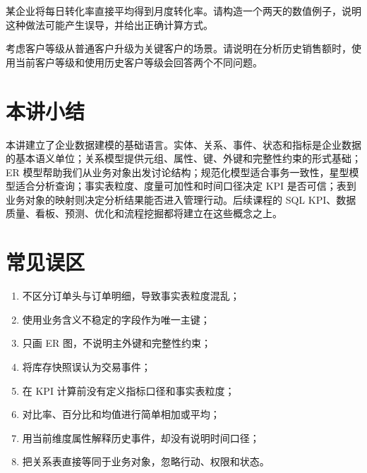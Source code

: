 \documentclass[UTF8,fontset=fandol,openany,zihao=-4]{ctexbook}
\begin{document}
\begin{exercise}
某企业将每日转化率直接平均得到月度转化率。请构造一个两天的数值例子，说明这种做法可能产生误导，并给出正确计算方式。
\end{exercise}

\begin{exercise}
考虑客户等级从普通客户升级为关键客户的场景。请说明在分析历史销售额时，使用当前客户等级和使用历史客户等级会回答两个不同问题。
\end{exercise}

\section*{本讲小结}

本讲建立了企业数据建模的基础语言。实体、关系、事件、状态和指标是企业数据的基本语义单位；关系模型提供元组、属性、键、外键和完整性约束的形式基础；ER 模型帮助我们从业务对象出发讨论结构；规范化模型适合事务一致性，星型模型适合分析查询；事实表粒度、度量可加性和时间口径决定 KPI 是否可信；表到业务对象的映射则决定分析结果能否进入管理行动。后续课程的 SQL KPI、数据质量、看板、预测、优化和流程挖掘都将建立在这些概念之上。

\section*{常见误区}

\begin{enumerate}
  \item 不区分订单头与订单明细，导致事实表粒度混乱；
  \item 使用业务含义不稳定的字段作为唯一主键；
  \item 只画 ER 图，不说明主外键和完整性约束；
  \item 将库存快照误认为交易事件；
  \item 在 KPI 计算前没有定义指标口径和事实表粒度；
  \item 对比率、百分比和均值进行简单相加或平均；
  \item 用当前维度属性解释历史事件，却没有说明时间口径；
  \item 把关系表直接等同于业务对象，忽略行动、权限和状态。
\end{enumerate}
\end{document}
